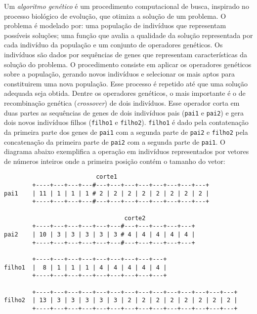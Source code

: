 \item Um \emph{algoritmo genético} é um procedimento computacional de busca,
inspirado no processo biológico de  evolução, que otimiza a solução de
um  pro\-ble\-ma.  O   problema é   modelado por: uma    população de
indivíduos que representam possíveis soluções; uma função que avalia a
qualidade da solução representada por cada indivíduo da população e um
conjunto  de operadores  genéticos.   Os   indivíduos  são dados   por
sequências   de genes que   representam características  da solução do
problema.  O procedimento consiste  em aplicar os operadores genéticos
sobre a população, gerando novos indivíduos e selecionar os mais aptos
para  constituirem uma  nova população.  Esse  processo é repetido até
que uma solução adequada seja obtida.  Dentre os operadores genéticos,
o mais importante é  o de recombinação genética  (\emph{crossover}) de
dois indivíduos.  Esse operador corta  em duas partes as sequências de
genes de dois indivíduos pais (\verb+pai1+  e \verb+pai2+) e gera dois
novos   indivíduos    filhos    (\verb+filho1+    e    \verb+filho2+).
\verb+filho1+ é dado pela contatenação da primeira  parte dos genes de
\verb+pai1+  com a segunda parte  de  \verb+pai2+ e \verb+filho2+ pela
concatenação  da primeira parte de \verb+pai2+  com a segunda parte de
\verb+pai1+.  O diagrama abaixo  exemplifica a operação  em indivíduos
representados por vetores de números inteiros  onde a primeira posição
contém o tamanho do vetor:
\vspace{-0.2cm}
\begin{center}
\begin{small}
\begin{verbatim}
                          corte1
        +----+---+---+---#---+---+---+---+---+---+---+---+
pai1    | 11 | 1 | 1 | 1 # 2 | 2 | 2 | 2 | 2 | 2 | 2 | 2 |
        +----+---+---+---#---+---+---+---+---+---+---+---+

                                  corte2
        +----+---+---+---+---+---#---+---+---+---+---+
pai2    | 10 | 3 | 3 | 3 | 3 | 3 # 4 | 4 | 4 | 4 | 4 |
        +----+---+---+---+---+---#---+---+---+---+---+

        +----+---+---+---+---+---+---+---+---+
filho1  |  8 | 1 | 1 | 1 | 4 | 4 | 4 | 4 | 4 |
        +----+---+---+---+---+---+---+---+---+

        +----+---+---+---+---+---+---+---+---+---+---+---+---+---+
filho2  | 13 | 3 | 3 | 3 | 3 | 3 | 2 | 2 | 2 | 2 | 2 | 2 | 2 | 2 |
        +----+---+---+---+---+---+---+---+---+---+---+---+---+---+
\end{verbatim}
\end{small}
\end{center}
